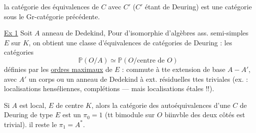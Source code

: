 
la catégorie des équivalences de $C$ avec $C'$ ($C'$ étant de Deuring) est une catégorie sous le Gr-catégorie précédente.

\uline{Ex 1} Soit $A$ anneau de Dedekind,  Pour    d'isomorphie d'algèbres  ass. semi-simples $E$ sur $K$, on obtient une classe d'équivalences de catégories de Deuring : les catégories
\[
\mathbb P(O/A)\simeq\mathbb P(O/\text{centre de }O)
\]
définies par les \uline{ordres maximaux} de $E$ :   commute à tte extension de base $A\mathbin{-}A'$, avec $A'$ un corps ou un anneau de Dedekind à ext. résiduelles ttes triviales (ex. : localisations henséliennes, complétions --- mais  localisations étales !!).


Si $A$ est local, $E$  de centre $K$, alors la catégorie  des autoéquivalences d'une $C$ de Deuring de type $E$ est un $\pi_0=1$ (tt bimodule sur $O$ biinvble des deux côtés est trivial).   il reste le $\pi_1=A^*$.

